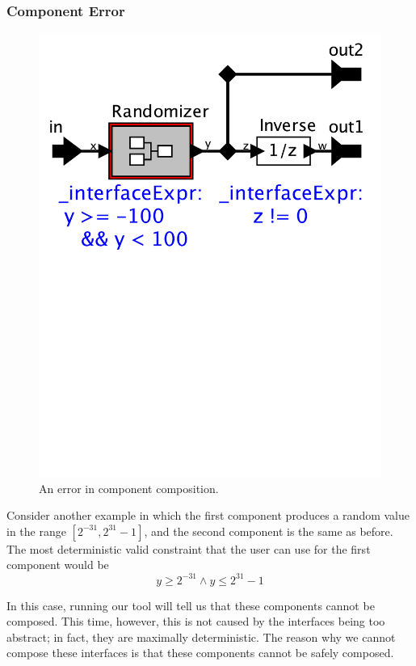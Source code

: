 \documentclass[preprint,11pt,authoryear]{sigplanconf}
\begin{document}
\subsubsection{Component Error} \label{sec:componentError}
\begin{figure}[htbp]
\centering
\includegraphics[width=\columnwidth]{figs/Randomizer}
\caption{An error in component composition.}
\label{fig:randomError}
\end{figure}

Consider another example in which the first component produces a random value in the range $[2^{-31}, 2^{31}-1]$, and the second component is the same as before.
The most deterministic valid constraint that the user can use for the first component would be
\[
y \ge 2^{-31} \wedge y \le 2^{31}-1
\]

In this case, running our tool will tell us that these components cannot be composed.
This time, however, this is not caused by the interfaces being too abstract; in fact, they are maximally deterministic.
The reason why we cannot compose these interfaces is that these components cannot be safely composed.
\end{document}
